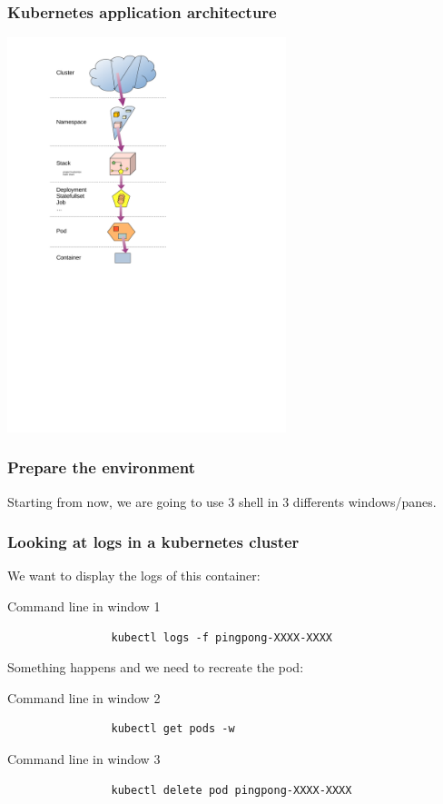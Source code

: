 	\begin{frame}
		\frametitle{Kubernetes application architecture}
		
		\begin{center}
		\includegraphics[height=11.5cm]{../../../resources/color/fromCluster2container.pdf}
		\end{center}
		
	\end{frame}		

	\begin{frame}
		\frametitle{Prepare the environment}
		
		Starting from now, we are going to use 3 shell in 3 differents windows/panes.
		
	\end{frame}		

	\begin{frame}[fragile]
		\frametitle{Looking at logs in a kubernetes cluster}
	
		We want to display the logs of this container:
		\begin{block}{Command line in window 1}
			\begin{verbatim}
				kubectl logs -f pingpong-XXXX-XXXX
			\end{verbatim}
		\end{block}
		
		Something happens and we need to recreate the pod:
		\begin{block}{Command line in window 2}
			\begin{verbatim}
				kubectl get pods -w
			\end{verbatim}
		\end{block}
		\begin{block}{Command line in window 3}
			\begin{verbatim}
				kubectl delete pod pingpong-XXXX-XXXX
			\end{verbatim}
		\end{block}
	\end{frame}
	
